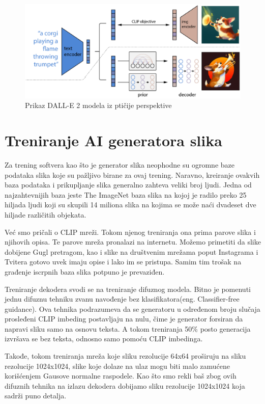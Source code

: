 \documentclass[12pt, letterpaper]{article}
\begin{document}
\begin{figure}[htp]
\centering
\includegraphics[width=1\textwidth]{dalle2.eps}
\caption{Prikaz DALL-E 2 modela iz ptičije perspektive}
\label{fig: dalle2slika}
\end{figure}

\section{Treniranje AI generatora slika}

Za trening softvera kao što je generator slika neophodne su ogromne baze podataka slika koje su pažljivo birane za ovaj trening. Naravno, kreiranje ovakvih baza podataka i prikupljanje slika generalno zahteva veliki broj ljudi. Jedna od najzahtevnijih baza jeste The ImageNet baza slika na kojoj je radilo preko 25 hiljada ljudi koji su skupili 14 miliona slika na kojima se može naći dvadeset dve hiljade različitih objekata\cite{clip}. 

Već smo pričali o CLIP mreži. Tokom njenog treniranja ona prima parove slika i njihovih opisa. Te parove mreža pronalazi na internetu. Možemo primetiti da slike dobijene Gugl pretragom, kao i slike na društvenim mrežama poput Instagrama i Tvitera gotovo uvek imaju opise i lako im se pristupa. Samim tim trošak na građenje iscrpnih baza slika potpuno je prevaziđen.

Treniranje dekodera svodi se na treniranje difuznog modela. Bitno je pomenuti jednu difuznu tehniku zvanu navođenje bez klasifikatora(eng. Classifier-free guidance). Ova tehnika podrazumeva da se generatoru u određenom broju slučaja prosleđeni CLIP imbeding postavljaju na nulu, čime je generator forsiran da napravi sliku samo na osnovu teksta. A tokom treniranja 50\% posto generacija izvršava se bez teksta, odnosno samo pomoću CLIP imbedinga\cite{openai_dali}.

Takođe, tokom treniranja mreža koje sliku rezolucije 64x64 proširuju na sliku rezolucije 1024x1024, slike koje dolaze na ulaz mogu biti malo zamućene korišćenjem Gausove normalne raspodele. Kao što smo rekli baš zbog ovih difuznih tehnika na izlazu dekodera dobijamo sliku rezolucije 1024x1024 koja sadrži puno detalja.
\end{document}

